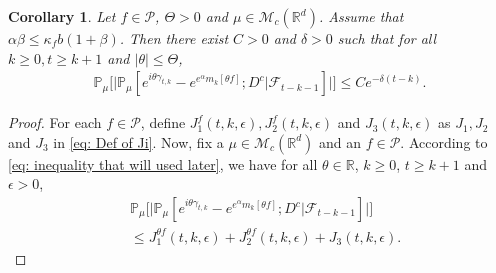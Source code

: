 \documentclass[12pt,a4paper]{amsart}
\theoremstyle{plain}
\newtheorem{cor}[thm]{Corollary}
\theoremstyle{definition}
\numberwithin{equation}{section}
\begin{document}
\begin{cor}\label{cor: used in next corollary}
Let $f\in \mathcal{P}$, $\Theta >0$ and $\mu\in \mathcal M_c(\mathbb R^d)$.
Assume that $\alpha\beta\leq \kappa_fb(1+\beta)$.
Then there exist $C>0$ and $\delta>0$ such that for all $k \geq 0, t\geq k+1$ and $|\theta|\leq \Theta$,
\begin{equation}\begin{split}
    \mathbb{P}_{\mu}\Big[\big|\mathbb{P}_{\mu}[e^{i\theta\gamma_{t,k}}-e^{e^{\alpha}m_k[\theta f]}; D^c | \mathscr F_{t-k-1}]\big|\Big]\leq Ce^{-\delta(t-k)}.
\end{split}\end{equation}
\end{cor}
\begin{proof}
	For each $f\in \mathcal P$, define $J_1^f(t,k,\epsilon), J_2^f(t,k,\epsilon)$ and $J_3(t,k,\epsilon)$ as $J_1, J_2$ and $J_3$ in \eqref{eq: Def of Ji}.
	Now, fix a $\mu \in \mathcal M_c(\mathbb R^d)$ and an $f\in \mathcal P$.
    According to \eqref{eq: inequality that will used later},  we have for all $\theta\in \mathbb R$, $k\geq 0$, $t\geq k+1$ and $\epsilon> 0$,
\begin{equation}\begin{split}
    &\mathbb{P}_{\mu}\Big[\big| \mathbb{P}_{\mu}[e^{i\theta \gamma_{t,k}}-e^{e^{\alpha}m_k[\theta f]}; D^c | \mathscr F_{t-k-1}]\big|\Big]
    \\&\leq J^{\theta f}_1(t,k,\epsilon) + J^{\theta f}_2(t,k,\epsilon)+J_3(t,k,\epsilon).
\end{split}\end{equation}


\end{proof}
\end{document}
